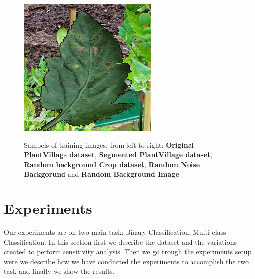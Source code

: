 \begin{figure}
\begin{center}
{	   \includegraphics[scale=0.35]{./images/random_backgorund}
	   }
	\begin{center}
		\caption{Sampels of training images, from left to right: \textbf{Original PlantVillage dataset}, \textbf{Segmented PlantVillage dataset}, \textbf{Random background Crop dataset}, \textbf{Random Noise Backgorund} and \textbf{Random Background Image}}
		\label{fig:samples}
	\end{center}
	\vspace{-15pt}
\end{center}
\end{figure}

\section{Experiments}
Our experiments are on two main task: Binary Classification, Multi-class Classification. In this section first we describe the dataset and the variations created to perform sensitivity analysis. Then we go trough the experiments setup were we describe how we have conducted the experiments to accomplish the two task and finally we show the results.

